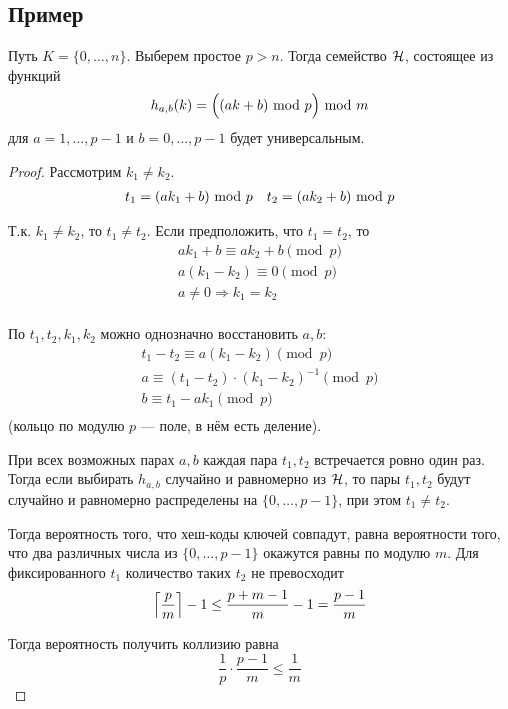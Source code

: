 \subsection{Пример}
\begin{theorem}
    Путь $K = \{0, \ldots, n\}$.
    Выберем простое $p > n$.
    Тогда семейство $\mathcal{H}$,
    состоящее из функций
    \[ h_{a, b}(k) = \Bigl( (ak + b) ~\text{mod}~ p \Bigr) ~\text{mod}~ m \]
    для $a = 1, \ldots, p - 1$ и $b = 0, \ldots, p - 1$
    будет универсальным.
\end{theorem}
\begin{proof}
    Рассмотрим $k_1 \ne k_2$.
    \begin{align*}
        & t_1 = (ak_1 + b) ~\text{mod}~ p &
        & t_2 = (ak_2 + b) ~\text{mod}~ p \\
    \end{align*}

    Т.к. $k_1 \ne k_2$, то $t_1 \ne t_2$.
    Если предположить, что $t_1 = t_2$,
    то
    \begin{gather*}
        ak_1 + b \equiv ak_2 + b \pmod{p} \\
        a(k_1 - k_2) \equiv 0 \pmod{p} \\
        a \ne 0 \Rightarrow k_1 = k_2 \\
    \end{gather*}

    По $t_1, t_2, k_1, k_2$ можно однозначно восстановить $a, b$:
    \begin{gather*}
        t_1 - t_2 \equiv a(k_1 - k_2) \pmod{p} \\
        a \equiv (t_1 - t_2) \cdot (k_1 - k_2)^{-1} \pmod{p} \\
        b \equiv t_1 - a k_1 \pmod{p} \\
    \end{gather*}
    (кольцо по модулю $p$ --- поле, в нём есть деление).

    При всех возможных парах $a, b$
    каждая пара $t_1, t_2$ встречается ровно один раз.
    Тогда если выбирать $h_{a, b}$ случайно и равномерно из $\mathcal{H}$,
    то пары $t_1, t_2$ будут случайно и равномерно
    распределены на $\{0, \ldots, p - 1\}$,
    при этом $t_1 \ne t_2$.

    Тогда вероятность того, что хеш-коды ключей совпадут,
    равна вероятности того, что два различных числа
    из $\{0, \ldots, p - 1\}$ окажутся равны по модулю $m$.
    Для фиксированного $t_1$ количество таких $t_2$ не превосходит
    \[
        \left \lceil \frac{p}{m} \right \rceil - 1
        \le \frac{p + m - 1}{m} - 1
        = \frac{p - 1}{m}
    \]

    Тогда вероятность получить коллизию равна
    \[
        \frac{1}{p} \cdot \frac{p - 1}{m} \le \frac{1}{m}
    \]
\end{proof}

